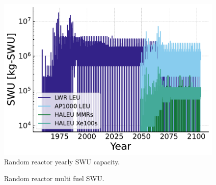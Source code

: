 

\begin{figure}[H]
    \centering
    \includegraphics[scale=0.7]{images/results/swu/multi_drng_swu_by_fuel.pdf}
    \caption{Random reactor yearly SWU capacity.}
    \label{fig:swu_yearly_random}
\end{figure}

\begin{figure}[H]
  \hfill
  \caption{Random reactor multi fuel SWU.}
  \label{fig:random_mf_swu}
\end{figure}

